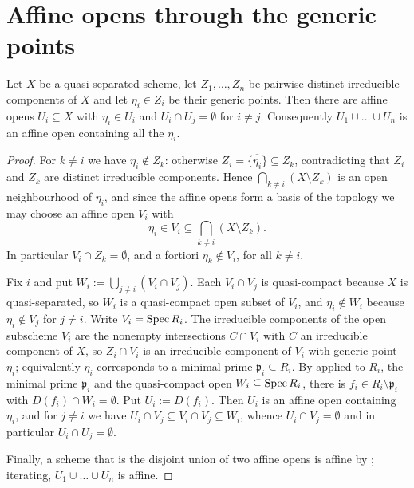 \section{Affine opens through the generic points}\label{sec:chow-affine-opens}

\begin{lemma}
\label{lem:chow-disjoint-affines}
\leanok
Let $X$ be a quasi-separated scheme, let $Z_1,\dots,Z_n$ be pairwise distinct
irreducible components of $X$ and let $\eta_i\in Z_i$ be their generic points.
Then there are affine opens $U_i\subseteq X$ with $\eta_i\in U_i$ and
$U_i\cap U_j=\emptyset$ for $i\neq j$.  Consequently
$U_1\cup\dots\cup U_n$ is an affine open containing all the $\eta_i$.
\end{lemma}
\begin{proof}
\leanok
For $k\neq i$ we have $\eta_i\notin Z_k$: otherwise
$Z_i=\overline{\{\eta_i\}}\subseteq Z_k$, contradicting that $Z_i$ and $Z_k$
are distinct irreducible components.  Hence
$\bigcap_{k\neq i}(X\setminus Z_k)$ is an open neighbourhood of $\eta_i$, and
since the affine opens form a basis of the topology we may choose an affine
open $V_i$ with
\[
  \eta_i\in V_i\subseteq\bigcap_{k\neq i}(X\setminus Z_k).
\]
In particular $V_i\cap Z_k=\emptyset$, and a fortiori $\eta_k\notin V_i$, for
all $k\neq i$.

Fix $i$ and put $W_i:=\bigcup_{j\neq i}(V_i\cap V_j)$.  Each $V_i\cap V_j$ is
quasi-compact because $X$ is quasi-separated, so $W_i$ is a quasi-compact open
subset of $V_i$, and $\eta_i\notin W_i$ because $\eta_i\notin V_j$ for
$j\neq i$.  Write $V_i=\operatorname{Spec} R_i$.  The irreducible components of the open
subscheme $V_i$ are the nonempty intersections $C\cap V_i$ with $C$ an
irreducible component of $X$, so $Z_i\cap V_i$ is an irreducible component of
$V_i$ with generic point $\eta_i$; equivalently $\eta_i$ corresponds to a
minimal prime $\mathfrak p_i\subseteq R_i$.  By  applied to
$R_i$, the minimal prime $\mathfrak p_i$ and the quasi-compact open
$W_i\subseteq\operatorname{Spec} R_i$, there is $f_i\in R_i\setminus\mathfrak p_i$ with
$D(f_i)\cap W_i=\emptyset$.  Put $U_i:=D(f_i)$.  Then $U_i$ is an affine open
containing $\eta_i$, and for $j\neq i$ we have
$U_i\cap V_j\subseteq V_i\cap V_j\subseteq W_i$, whence
$U_i\cap V_j=\emptyset$ and in particular $U_i\cap U_j=\emptyset$.

Finally, a scheme that is the disjoint union of two affine opens is affine by
; iterating, $U_1\cup\dots\cup U_n$ is affine.
\end{proof}

